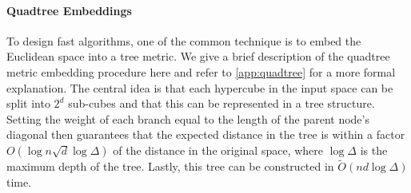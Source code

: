 \paragraph*{Quadtree Embeddings}

To design fast algorithms, one of the common technique is to embed the Euclidean space into a tree metric.
We give a brief description of the quadtree metric embedding procedure here and refer to \cref{app:quadtree} for a more formal explanation.  The central idea is
that each hypercube in the input space can be split into $2^d$ sub-cubes and that this can be represented in a tree structure. Setting the weight of each branch
equal to the length of the parent node's diagonal then guarantees that the expected distance in the tree is within a factor $O(\log n \sqrt{d} \log
\Delta)$ of the distance in the original space,
where $\log \Delta$ is the maximum depth of the tree. Lastly, this tree can be constructed in $\tilde{O}(nd \log \Delta)$ time.
